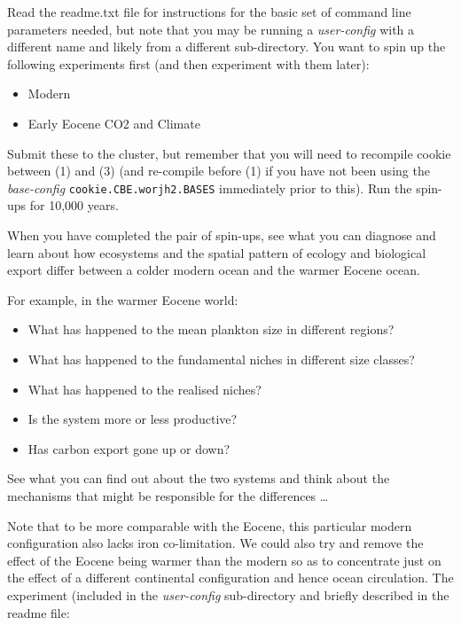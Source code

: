 Read the \textsf{\footnotesize readme.txt} file for instructions for the basic set of command line parameters needed, but note that you may be running a \textit{user-config} with a different name and likely from a different sub-directory. You want to spin up the following experiments first (and then experiment with them later):

\vspace{1mm}
\begin{itemize}[noitemsep]
\item[(1)] \textsf{\footnotesize Modern}
\item[(3)] \textsf{\footnotesize Early Eocene CO2 and Climate}
\end{itemize}
\vspace{1mm}

\noindent Submit these to the cluster, but remember that you will need to recompile cookie between (1) and (3) (and re-compile before (1) if you have not been using the \textit{base-config} \texttt{cookie.CBE.worjh2.BASES} immediately prior to this). Run the spin-ups for 10,000 years.

\vspace{2mm}
\noindent When you have completed the pair of spin-ups, see what you can diagnose and learn about how ecosystems and the spatial pattern of ecology and biological export differ between a colder modern ocean and the warmer Eocene ocean.

For example, in the warmer Eocene world:

\vspace{1mm}
\begin{itemize}
\item What has happened to the mean plankton size in different regions?
\item What has happened to the fundamental niches in different size classes?
\item What has happened to the realised niches?
\item Is the system more or less productive?
\item Has carbon export gone up or down?
\end{itemize}
\vspace{1mm}

See what you can find out about the two systems and think about the mechanisms that might be responsible for the differences \dots

\vspace{8mm}
\pagebreak

Note that to be more comparable with the Eocene, this particular modern configuration also lacks iron co-limitation. We could also try and remove the effect of the Eocene being warmer than the modern so as to concentrate just on the effect of a different continental configuration and hence ocean circulation. The experiment (included in the \textit{user-config} sub-directory and briefly described in the \textsf{\footnotesize readme } file:

